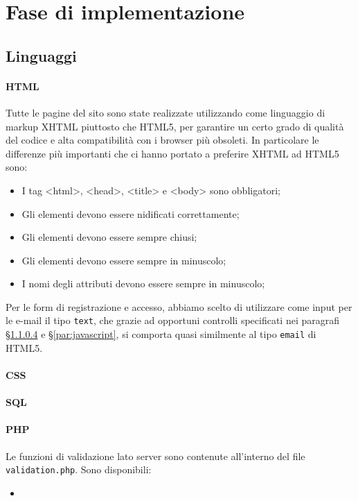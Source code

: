 \section{Fase di implementazione}
\label{sec:fase_di_implementazione}
\subsection{Linguaggi}
\paragraph{HTML}
Tutte le pagine del sito sono state realizzate utilizzando come linguaggio di markup XHTML piuttosto che HTML5, per garantire un certo grado di qualità del codice e alta compatibilità con i browser più obsoleti. In particolare le differenze più importanti che ci hanno portato a preferire XHTML ad HTML5 sono:
\begin{itemize}
    \item I tag <html>, <head>, <title> e <body> sono obbligatori;
    \item Gli elementi devono essere nidificati correttamente;
    \item Gli elementi devono essere sempre chiusi;
    \item Gli elementi devono essere sempre in minuscolo;
    \item I nomi degli attributi devono essere sempre in minuscolo;
\end{itemize}
Per le form di registrazione e accesso, abbiamo scelto di utilizzare come input per le e-mail il tipo \texttt{text}, che grazie ad opportuni controlli specificati nei paragrafi \S\ref{par:php} e \S\ref{par:javascript}, si comporta quasi similmente al tipo \texttt{email} di HTML5. %

\paragraph{CSS}

\paragraph{SQL}

\paragraph{PHP}\label{par:php}
Le funzioni di validazione lato server sono contenute all'interno del file \texttt{validation.php}. Sono disponibili:
\begin{itemize}
	\item 
\end{itemize}

